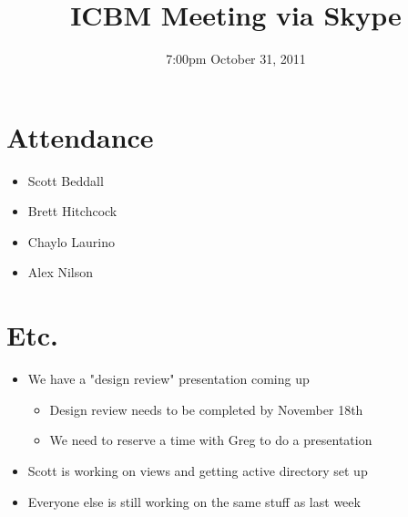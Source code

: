 \documentclass{article}
\begin{document}
\title{ICBM Meeting via Skype}
\date{7:00pm October 31, 2011}
\maketitle

\section{Attendance}
\begin{itemize}
\item Scott Beddall
\item Brett Hitchcock
\item Chaylo Laurino
\item Alex Nilson
\end{itemize}

\section{Etc.}
\begin{itemize}
\item We have a "design review" presentation coming up
	\begin{itemize}
	\item Design review needs to be completed by November 18th
	\item We need to reserve a time with Greg to do a presentation
	\end{itemize}
\item Scott is working on views and getting active directory set up
\item Everyone else is still working on the same stuff as last week
\end{itemize}
\end{document}
